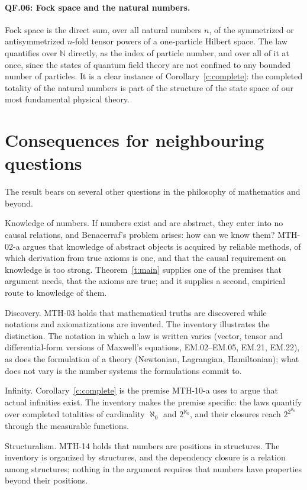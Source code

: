 \documentclass{situationist-preprint}
\begin{document}
\paragraph{QF.06: Fock space and the natural numbers.} Fock space is the direct sum, over all natural numbers $n$, of the symmetrized or antisymmetrized $n$-fold tensor powers of a one-particle Hilbert space. The law quantifies over $\mathbb N$ directly, as the index of particle number, and over all of it at once, since the states of quantum field theory are not confined to any bounded number of particles. It is a clear instance of Corollary~\ref{c:complete}: the completed totality of the natural numbers is part of the structure of the state space of our most fundamental physical theory.

\section{Consequences for neighbouring questions}\label{s:cons}

The result bears on several other questions in the philosophy of mathematics and beyond.

Knowledge of numbers. If numbers exist and are abstract, they enter into no causal relations, and Benacerraf's problem arises: how can we know them? MTH-02-a argues that knowledge of abstract objects is acquired by reliable methods, of which derivation from true axioms is one, and that the causal requirement on knowledge is too strong. Theorem~\ref{t:main} supplies one of the premises that argument needs, that the axioms are true; and it supplies a second, empirical route to knowledge of them.

Discovery. MTH-03 holds that mathematical truths are discovered while notations and axiomatizations are invented. The inventory illustrates the distinction. The notation in which a law is written varies (vector, tensor and differential-form versions of Maxwell's equations, EM.02--EM.05, EM.21, EM.22), as does the formulation of a theory (Newtonian, Lagrangian, Hamiltonian); what does not vary is the number systems the formulations commit to.

Infinity. Corollary~\ref{c:complete} is the premise MTH-10-a uses to argue that actual infinities exist. The inventory makes the premise specific: the laws quantify over completed totalities of cardinality $\aleph_0$ and $2^{\aleph_0}$, and their closures reach $2^{2^{\aleph_0}}$ through the measurable functions.

Structuralism. MTH-14 holds that numbers are positions in structures. The inventory is organized by structures, and the dependency closure is a relation among structures; nothing in the argument requires that numbers have properties beyond their positions.
\end{document}
